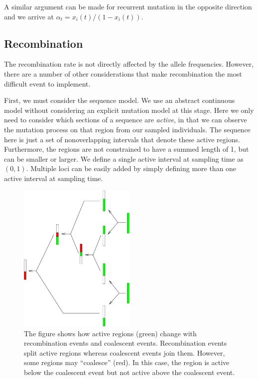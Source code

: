 \documentclass{article}
\begin{document}
A similar argument can be made for recurrent mutation in the opposite direction
and we arrive at $\alpha_t=x_i(t)/(1-x_i(t))$.

\subsection{Recombination}

The recombination rate is not directly affected by the allele frequencies.
However, there are a number of other considerations that make recombination the
most difficult event to implement.

First, we must consider the sequence model. We use an abstract continuous model
without considering an explicit mutation model at this stage. Here we only need
to consider which sections of a sequence are {\it active}, in that we can
observe the mutation process on that region from our sampled individuals. The
sequence here is just a set of nonoverlapping intervals that denote these active regions.
Furthermore, the regions are not constrained to have a summed length of 1, but
can be smaller or larger. We define a single active interval at sampling time as
$(0,1)$. Multiple loci can be easily added by simply defining more than one
active interval at sampling time.

\begin{figure}[hbtp]
\begin{center}
\includegraphics[width=0.5\textwidth,angle=-90]{recombination}
\end{center}
\caption[Recombination/Coalescent Example]{The figure shows how active regions
(green) change with recombination events and coalescent events. Recombination
events split active regions whereas coalescent events join them. However, some
regions may ``coalesce'' (red). In this case, the region is active below the
coalescent event but not active above the coalescent event.}
\label{fig:recomb}
\end{figure}
\end{document}
